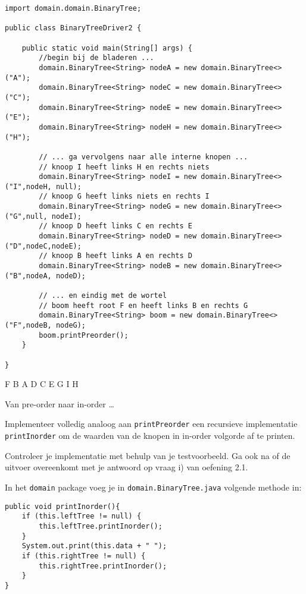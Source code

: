 \begin{oef}
\begin{opl}
\begin{oefenumerate}
\begin{lstlisting}[caption={Binaire boom uit oefening 1}, label=binoef1]
import domain.domain.BinaryTree;

public class BinaryTreeDriver2 {

	public static void main(String[] args) {
		//begin bij de bladeren ...
		domain.BinaryTree<String> nodeA = new domain.BinaryTree<>("A");
		domain.BinaryTree<String> nodeC = new domain.BinaryTree<>("C");
		domain.BinaryTree<String> nodeE = new domain.BinaryTree<>("E");
		domain.BinaryTree<String> nodeH = new domain.BinaryTree<>("H");

		// ... ga vervolgens naar alle interne knopen ...
		// knoop I heeft links H en rechts niets
		domain.BinaryTree<String> nodeI = new domain.BinaryTree<>("I",nodeH, null);
		// knoop G heeft links niets en rechts I
		domain.BinaryTree<String> nodeG = new domain.BinaryTree<>("G",null, nodeI);
		// knoop D heeft links C en rechts E
		domain.BinaryTree<String> nodeD = new domain.BinaryTree<>("D",nodeC,nodeE);
		// knoop B heeft links A en rechts D
		domain.BinaryTree<String> nodeB = new domain.BinaryTree<>("B",nodeA, nodeD);
		
		// ... en eindig met de wortel
		// boom heeft root F en heeft links B en rechts G
		domain.BinaryTree<String> boom = new domain.BinaryTree<>("F",nodeB, nodeG);
		boom.printPreorder();
	}

}
 \end{lstlisting}
 
 \item F B A D C E G I H 
\end{oefenumerate}

\end{opl}
\end{oef}




\begin{oef}
\code Van pre-order naar in-order …
\begin{oefenumerate}
	\item Implementeer volledig analoog aan \verb=printPreorder= een recursieve implementatie \verb=printInorder= om de waarden van de knopen in in-order volgorde af te printen.
	\item Controleer je implementatie met behulp van je testvoorbeeld. Ga ook na of de uitvoer overeenkomt met je antwoord op vraag i) van oefening 2.1.
\end{oefenumerate}
\begin{opl}
In het \verb+domain+ package voeg je in \verb+domain.BinaryTree.java+ volgende methode in:
\begin{lstlisting}[caption={In-order doorloop van een binaire boom}, label=bininorder]
public void printInorder(){
	if (this.leftTree != null) {
		this.leftTree.printInorder();
	}
	System.out.print(this.data + " ");
	if (this.rightTree != null) {
		this.rightTree.printInorder();
	}
}
\end{lstlisting}

\end{opl}
\end{oef}


